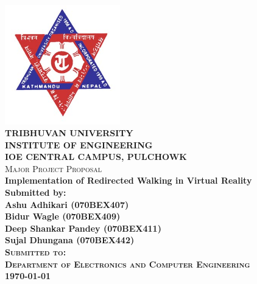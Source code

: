 \begin{titlepage}

\newcommand{\HRule}{\rule{\linewidth}{0.3mm}}
\center

\includegraphics[width=50mm]{tu.jpg}\\
\textsc{\LARGE \bfseries TRIBHUVAN UNIVERSITY}\\[0.5cm] %
\textsc{\large \bfseries INSTITUTE OF ENGINEERING}\\
\textsc{\large \bfseries IOE CENTRAL CAMPUS, PULCHOWK}\\[0.5cm]
\textsc{Major Project Proposal} \\[0.2cm]
\Large \textbf{Implementation of Redirected Walking in Virtual Reality}\\[0.5cm]
\bfseries
Submitted by:\\
Ashu Adhikari (070BEX407)\\
Bidur Wagle (070BEX409)\\
Deep Shankar Pandey (070BEX411)\\
Sujal Dhungana (070BEX442)\\[0.5cm]

\textsc{Submitted to:}\\
\textsc{Department of Electronics and Computer Engineering}
\\[0.4cm]

{\large \today}
\vfill
\end{titlepage}
